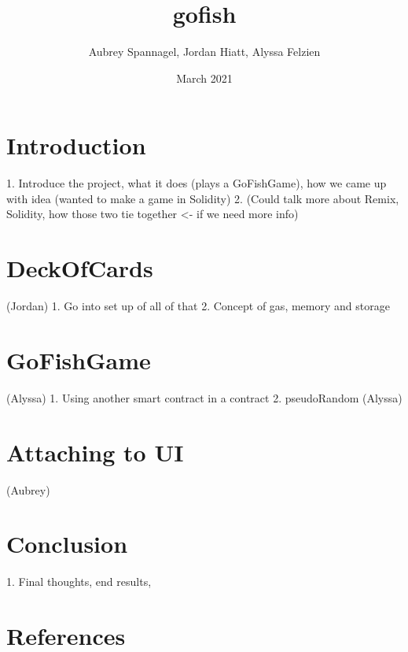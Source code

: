 \documentclass{article}
\title{gofish}
\author{Aubrey Spannagel, Jordan Hiatt, Alyssa Felzien }
\date{March 2021}
\begin{document}
\maketitle

\section{Introduction}
1. Introduce the project, what it does (plays a GoFishGame), how we came up with idea (wanted to make a game in Solidity) 
2. (Could talk more about Remix, Solidity, how those two tie together <- if we need more info)

\section{DeckOfCards} (Jordan)
1. Go into set up of all of that
2. Concept of gas, memory and storage

\section{GoFishGame} (Alyssa)
1. Using another smart contract in a contract
2. pseudoRandom (Alyssa)

\section{Attaching to UI} (Aubrey)

\section{Conclusion}
1. Final thoughts, end results, 

\section{References} 
\end{document}
